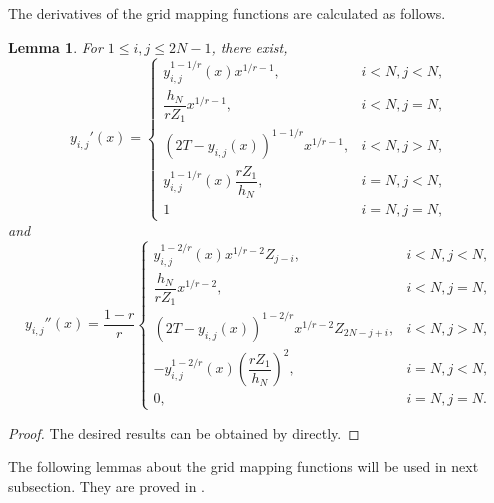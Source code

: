 \documentclass{amsart}
\newtheorem{lemma}[theorem]{Lemma}
\theoremstyle{definition}
\theoremstyle{remark}
\numberwithin{equation}{section}
\begin{document}
The derivatives of the grid mapping functions are calculated as follows.
\begin{lemma} \label{lmm:derivatives-of-MTFs}
For $1\le i,j \le 2N-1$, there exist, %
  \begin{equation*}
    y_{i,j}'(x) = \begin{cases}
      y_{i,j}^{1-1/r}(x) x^{1/r-1}   ,& i< N, j< N, \\
      \dfrac{h_N}{r Z_1} x^{1/r-1}  ,& i< N, j=N, \\
      (2T-y_{i,j}(x))^{1-1/r} x^{1/r-1}   ,& i< N, j>N, \\
      y_{i,j}^{1-1/r}(x) \dfrac{r Z_1}{h_N}  ,& i=N, j< N, \\
      1   & i=N, j=N ,
    \end{cases}
  \end{equation*}
  and
  \begin{equation*}
    y_{i,j}''(x) = \frac{1-r}{r}
      \begin{cases}
        y_{i,j}^{1-2/r}(x) x^{1/r-2} Z_{j-i}   ,& i< N, j< N, \\
        \dfrac{h_N}{r Z_1} x^{1/r-2}  ,& i< N, j=N, \\
        (2T-y_{i,j}(x))^{1-2/r} x^{1/r-2} Z_{2N-j+i}   ,& i< N, j>N, \\
        -y_{i,j}^{1-2/r}(x) \left(\dfrac{r Z_1}{h_N}\right)^2  ,& i=N, j< N, \\
        0   ,& i=N, j=N .
      \end{cases}
  \end{equation*}
\end{lemma}
\begin{proof}
    The desired results can be obtained by  directly.
\end{proof}


The following lemmas about the grid mapping functions will be used in next subsection.
They are proved in .
\end{document}
